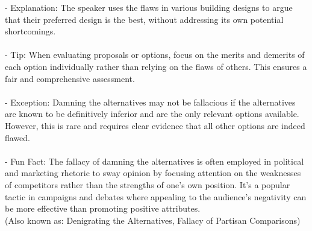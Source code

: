 \documentclass[a4paper,12pt,single,pdftex]{scrbook}
\begin{document}
    
        - Explanation: The speaker uses the flaws in various building designs to argue that their preferred design is the best, without addressing its own potential shortcomings.
    \\

    
      
    \\

    
      - Tip: When evaluating proposals or options, focus on the merits and demerits of each option individually rather than relying on the flaws of others. This ensures a fair and comprehensive assessment.
    \\

    
      
    \\

    
      - Exception: Damning the alternatives may not be fallacious if the alternatives are known to be definitively inferior and are the only relevant options available. However, this is rare and requires clear evidence that all other options are indeed flawed.
    \\

    
      
    \\

    
      - Fun Fact: The fallacy of damning the alternatives is often employed in political and marketing rhetoric to sway opinion by focusing attention on the weaknesses of competitors rather than the strengths of one’s own position. It’s a popular tactic in campaigns and debates where appealing to the audience’s negativity can be more effective than promoting positive attributes.
    \\

  
    
      (Also known as: Denigrating the Alternatives, Fallacy of Partisan Comparisons)
    \\
\end{document}
